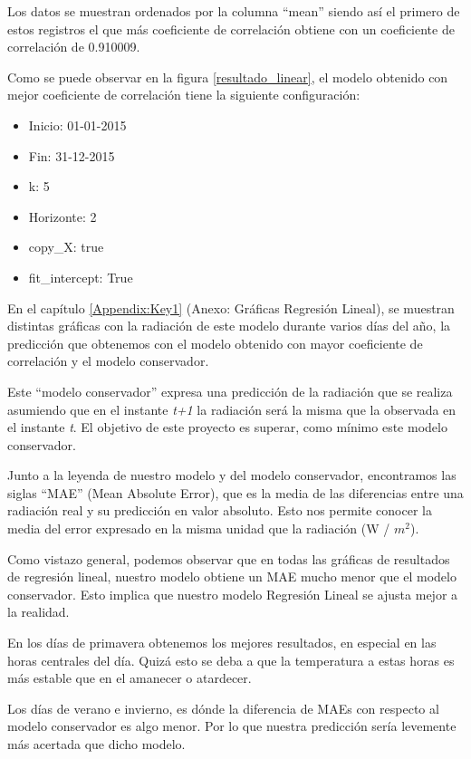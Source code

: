 Los datos se muestran ordenados por la columna ``mean'' siendo así el primero de estos registros el que más coeficiente de correlación obtiene con un coeficiente de correlación de 0.910009.

Como se puede observar en la figura \ref{resultado_linear}, el modelo obtenido con mejor coeficiente de correlación tiene la siguiente configuración:

\begin{itemize}
\item Inicio: 01-01-2015
\item Fin: 31-12-2015
\item k: 5
\item Horizonte: 2
\item copy\_X: true
\item fit\_intercept: True
\end{itemize}

En el capítulo \ref{Appendix:Key1} (Anexo: Gráficas Regresión Lineal), se muestran distintas gráficas con la radiación de este modelo durante varios días del año, la predicción que obtenemos con el modelo obtenido con mayor coeficiente de correlación y el modelo conservador.

Este ``modelo conservador'' expresa una predicción de la radiación que se realiza asumiendo que en el instante \emph{t+1} la radiación será la misma que la observada en el instante \emph{t}.
El objetivo de este proyecto es superar, como mínimo este modelo conservador.

Junto a la leyenda de nuestro modelo y del modelo conservador, encontramos las siglas ``MAE'' (Mean Absolute Error), que es la media de las diferencias entre una radiación real y su predicción  en valor absoluto. Esto nos permite conocer la media del error expresado en la misma unidad que la radiación (W / \(m^2\)).

Como vistazo general, podemos observar que en todas las gráficas de resultados de regresión lineal, nuestro modelo obtiene un MAE mucho menor que el modelo conservador. Esto implica que nuestro modelo Regresión Lineal se ajusta mejor a la realidad.

En los días de primavera obtenemos los mejores resultados, en especial en las horas centrales del día. Quizá esto se deba a que la temperatura a estas horas es más estable que en el amanecer o atardecer.

Los días de verano e invierno, es dónde la diferencia de MAEs con respecto al modelo conservador es algo menor. Por lo que nuestra predicción sería levemente más acertada que dicho modelo.

